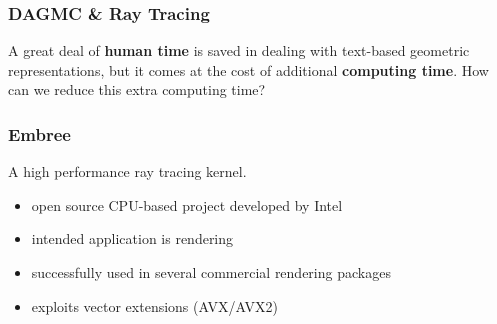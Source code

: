 \documentclass[12pt]{beamer}
\begin{document}
\begin{frame}

  \frametitle{DAGMC \& Ray Tracing}
  
  A great deal of \textbf{human time} is saved in dealing with text-based geometric representations, but it comes at the cost of additional \textbf{computing time}.
 \vfill
 How can we reduce this extra computing time?

 \vfill

  
\end{frame}

\begin{frame}
  \frametitle{Embree}
  \begin{center}
  \end{center}
  A high performance ray tracing kernel. \cite{embree}
  \vfill
  \begin{itemize}
  \item open source CPU-based project developed by Intel
  \item intended application is rendering
  \item successfully used in several commercial rendering packages
  \item exploits vector extensions (AVX/AVX2) 
  \end{itemize}

  
\end{frame}
\end{document}
